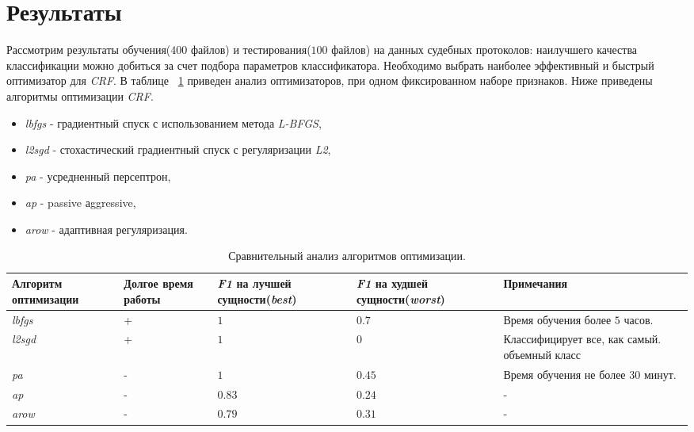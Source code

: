 \documentclass{csmathnotes}
\begin{document}
\section*{Результаты}
Рассмотрим результаты обучения($400$ файлов) и тестирования($100$ файлов) на данных судебных протоколов: наилучшего качества классификации можно добиться за счет подбора параметров классификатора. Необходимо выбрать наиболее эффективный и быстрый оптимизатор для \emph{CRF}. В таблице ~\ref{tabl:table1} приведен анализ оптимизаторов, при одном фиксированном наборе признаков. Ниже приведены алгоритмы оптимизации \emph{CRF}.

\begin{itemize}
    \item \emph{lbfgs} - градиентный спуск с использованием метода 
    \emph{L-BFGS},
    \item \emph{l2sgd} - стохастический  градиентный спуск с регуляризации \emph{L2},
    \item \emph{pa} - усредненный персептрон,
    \item \emph{ap} - passive аggressive,
    \item \emph{arow} - адаптивная регуляризация.
\end{itemize}

\begin{table}[!h]
    \begin{center}
        \begin{tabular}{|p{2cm}|p{1.6cm}|p{1.5cm}|p{1.5cm}|p{2.5cm}|}
            \hline
            Алгоритм оптимизации &  Долгое время работы & \emph{F1} на лучшей сущности(\emph{best}) & \emph{F1} на худшей сущности(\emph{worst}) & Примечания \\
            \hline
            \emph{lbfgs} & + & $1$ & $0.7$ & Время обучения более $5$ часов.  \\
            \hline
            \emph{l2sgd} & + & $1$  & $0$ & Классифицирует все, как самый. объемный класс \\
            \hline
            \emph{pa} & - & $1$  & $0.45$ & Время обучения не более $30$ минут. \\
            \hline
            \emph{ap} & - & $0.83$ & $0.24$  & - \\
            \hline
            \emph{arow} & - & $0.79$ & $0.31$  & - \\
            \hline
        \end{tabular}
    \end{center}
    \caption{\label{tabl:table1}Сравнительный анализ алгоритмов оптимизации.}
\end{table}
\end{document}
